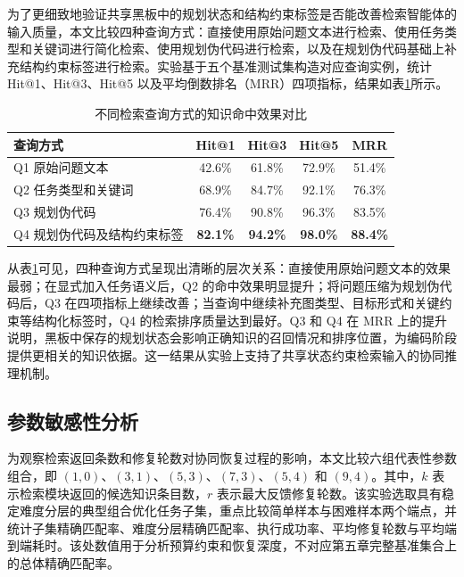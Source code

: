 为了更细致地验证共享黑板中的规划状态和结构约束标签是否能改善检索智能体的输入质量，本文比较四种查询方式：直接使用原始问题文本进行检索、使用任务类型和关键词进行简化检索、使用规划伪代码进行检索，以及在规划伪代码基础上补充结构约束标签进行检索。实验基于五个基准测试集构造对应查询实例，统计 Hit@1、Hit@3、Hit@5 以及平均倒数排名（MRR）四项指标，结果如表\ref{tab:retrieval_quality}所示。

\begin{table}[htbp]
\centering
\caption{不同检索查询方式的知识命中效果对比}
\label{tab:retrieval_quality}
\begin{tabular}{lcccc}
\toprule
查询方式 & Hit@1 & Hit@3 & Hit@5 & MRR \\
\midrule
Q1 原始问题文本 & 42.6\% & 61.8\% & 72.9\% & 51.4\% \\
Q2 任务类型和关键词 & 68.9\% & 84.7\% & 92.1\% & 76.3\% \\
Q3 规划伪代码 & 76.4\% & 90.8\% & 96.3\% & 83.5\% \\
Q4 规划伪代码及结构约束标签 & \textbf{82.1\%} & \textbf{94.2\%} & \textbf{98.0\%} & \textbf{88.4\%} \\
\bottomrule
\end{tabular}
\end{table}

从表\ref{tab:retrieval_quality}可见，四种查询方式呈现出清晰的层次关系：直接使用原始问题文本的效果最弱；在显式加入任务语义后，Q2 的命中效果明显提升；将问题压缩为规划伪代码后，Q3 在四项指标上继续改善；当查询中继续补充图类型、目标形式和关键约束等结构化标签时，Q4 的检索排序质量达到最好。Q3 和 Q4 在 MRR 上的提升说明，黑板中保存的规划状态会影响正确知识的召回情况和排序位置，为编码阶段提供更相关的知识依据。这一结果从实验上支持了共享状态约束检索输入的协同推理机制。

\subsection{参数敏感性分析}

为观察检索返回条数和修复轮数对协同恢复过程的影响，本文比较六组代表性参数组合，即 $(1,0)$、$(3,1)$、$(5,3)$、$(7,3)$、$(5,4)$ 和 $(9,4)$。其中，$k$ 表示检索模块返回的候选知识条目数，$r$ 表示最大反馈修复轮数。该实验选取具有稳定难度分层的典型组合优化任务子集，重点比较简单样本与困难样本两个端点，并统计子集精确匹配率、难度分层精确匹配率、执行成功率、平均修复轮数与平均端到端耗时。该处数值用于分析预算约束和恢复深度，不对应第五章完整基准集合上的总体精确匹配率。

